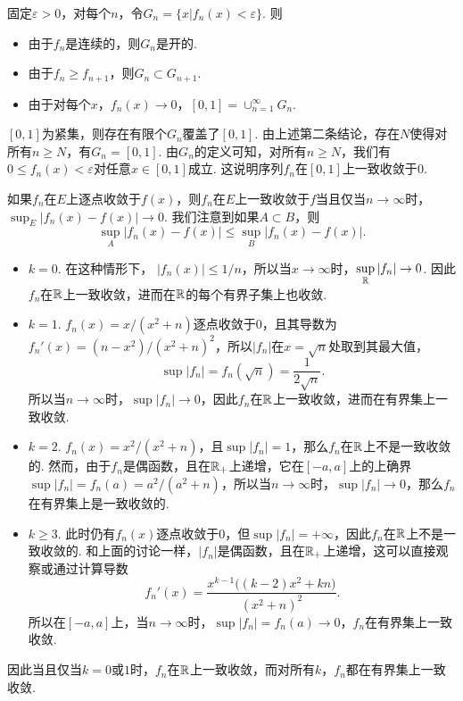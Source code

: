 \begin{ans}
  固定$\varepsilon>0$，对每个$n$，令$G_n=\{x|f_n(x)<\varepsilon\}$. 则
  \begin{itemize}
    \item 由于$f_n$是连续的，则$G_n$是开的.
    \item 由于$f_n\ge f_{n+1}$，则$G_n\subset G_{n+1}$.
    \item 由于对每个$x$，$f_n(x)\to0$，$[0,1]=\cup_{n=1}^\infty G_n$.
  \end{itemize}
  $[0,1]$为紧集，则存在有限个$G_n$覆盖了$[0,1]$. 由上述第二条结论，存在$N$使得对所有$n\ge N$，有$G_n=[0,1]$. 由$G_n$的定义可知，对所有$n\ge N$，我们有$0\le f_n(x)<\varepsilon$对任意$x\in[0,1]$成立. 这说明序列$f_n$在$[0,1]$上一致收敛于$0$.
\end{ans}

\begin{ans}
  如果$f_n$在$E$上逐点收敛于$f(x)$，则$f_n$在$E$上一致收敛于$f$当且仅当$n\to\infty$时，$\sup_E|f_n(x)-f(x)|\to0$. 我们注意到如果$A\subset B$，则
  \[ \sup_A|f_n(x)-f(x)| \le \sup_B|f_n(x)-f(x)|. \]
  \begin{itemize}
    \item $k=0$. 在这种情形下， $|f_n(x)|\le1/n$，所以当$x\to\infty$时，$\sup_{\MR}|f_n|\to0$. 因此$f_n$在$\mathbb R$上一致收敛，进而在$\mathbb R$的每个有界子集上也收敛.
    \item $k=1$. $f_n(x)=x/(x^2+n)$逐点收敛于0，且其导数为$f_n'(x)=(n-x^2)/(x^2+n)^2$，所以$|f_n|$在$x=\sqrt n$处取到其最大值，
        \[ \sup|f_n|=f_n(\sqrt n)=\frac1{2\sqrt n}. \]
        所以当$n\to\infty$时，$\sup|f_n|\to0$，因此$f_n$在$\mathbb R$上一致收敛，进而在有界集上一致收敛.
    \item $k=2$. $f_n(x)=x^2/(x^2+n)$，且$\sup|f_n|=1$，那么$f_n$在$\mathbb R$上不是一致收敛的. 然而，由于$f_n$是偶函数，且在$\mathbb R_+$上递增，它在$[-a,a]$上的上确界$\sup|f_n|=f_n(a)=a^2/(a^2+n)$，所以当$n\to\infty$时，$\sup|f_n|\to0$，那么$f_n$在有界集上是一致收敛的.
    \item $k\ge3$. 此时仍有$f_n(x)$逐点收敛于0，但$\sup|f_n|=+\infty$，因此$f_n$在$\mathbb R$上不是一致收敛的. 和上面的讨论一样，$|f_n|$是偶函数，且在$\mathbb R_+$上递增，这可以直接观察或通过计算导数
        \[ f_n'(x)=\frac{x^{k-1}\big((k-2)x^2+kn\big)}
        {(x^2+n)^2}. \]
        所以在$[-a,a]$上，当$n\to\infty$时，$\sup|f_n|=f_n(a)\to0$，$f_n$在有界集上一致收敛.
  \end{itemize}

  因此当且仅当$k=0$或$1$时，$f_n$在$\mathbb R$上一致收敛，而对所有$k$，$f_n$都在有界集上一致收敛.

\end{ans}

